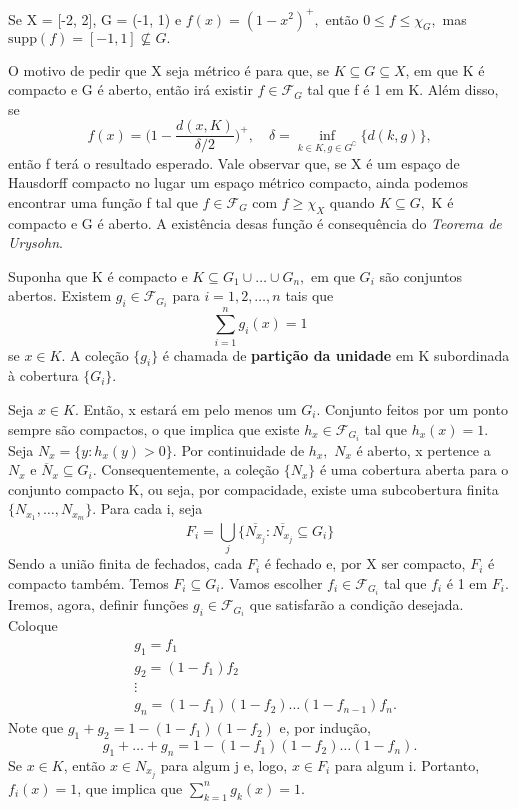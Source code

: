 \documentclass[measure_theory.tex]{subfiles}
\begin{document}
\begin{example}
	Se X = [-2, 2], G = (-1, 1) e \(f(x) = (1-x^{2})^{+},\) então \(0 \leq f \leq \chi_{G},\) mas \(\mathrm{supp}(f) = [-1, 1]\not\subseteq G.\)
\end{example}
O motivo de pedir que X seja métrico é para que, se \(K\subseteq G\subseteq X\), em que K é compacto e G é aberto, então irá existir \(f\in \mathcal{F}_{G}\) tal que f é 1 em K. Além disso, se
\[
	f(x) = \biggl(1 - \frac{d(x, K)}{\delta/2}\biggr)^{+},\quad \delta  = \inf_{k\in K, g\in G ^{\complement}}\{d(k, g)\},
\]
então f terá o resultado esperado. Vale observar que, se X é um espaço de Hausdorff compacto no lugar um espaço métrico compacto, ainda podemos encontrar uma função f tal que \(f\in \mathcal{F}_{G}\) com \(f\geq \chi_{X}\) quando \(K\subseteq G,\) K é compacto e G é aberto. A existência desas função
é consequência do \textit{Teorema de Urysohn}.
\begin{prop*}
	Suponha que K é compacto e \(K\subseteq G_1\cup \dotsc \cup G_{n},\) em que \(G_{i}\) são conjuntos abertos. Existem \(g_{i}\in \mathcal{F}_{G_{i}}\) para \(i= 1, 2, \dotsc , n\) tais que
	\[
		\sum\limits_{i=1}^{n}g_{i}(x) = 1
	\]
	se \(x\in K\). A coleção \(\{g_{i}\}\) é chamada de \textbf{partição da unidade} em K subordinada à cobertura \(\{G_{i}\}\).
\end{prop*}
\begin{proof*}
	Seja \(x\in K.\) Então, x estará em pelo menos um \(G_{i}\). Conjunto feitos por um ponto sempre são compactos, o que implica que existe \(h_{x}\in \mathcal{F}_{G_{i}}\) tal que \(h_{x}(x) = 1.\) Seja \(N_{x} = \{y: h_{x}(y) > 0\}.\) Por continuidade de \(h_{x},\) \(N_{x}\) é aberto, x pertence a \(N_{x}\) e \(\overline{N}_{x}\subseteq G_{i}.\)
	Consequentemente, a coleção \(\{N_{x}\}\) é uma cobertura aberta para o conjunto compacto K, ou seja, por compacidade, existe uma subcobertura finita \(\{N_{x_{1}},\dotsc ,N_{x_{m}}\}\). Para cada i, seja
	\[
		F_{i} = \bigcup_{j}^{}\{\overline{N_{x_{j}}}: \overline{N_{x_{j}}}\subseteq G_{i}\}
	\]
	Sendo a união finita de fechados, cada \(F_{i}\) é fechado e, por X ser compacto, \(F_{i}\) é compacto também. Temos \(F_{i}\subseteq G_{i}\). Vamos escolher \(f_{i}\in \mathcal{F}_{G_{i}}\) tal que \(f_{i}\) é 1 em \(F_{i}.\) Iremos, agora, definir funções \(g_{i}\in \mathcal{F}_{G_{i}}\) que satisfarão
	a condição desejada. Coloque
	\begin{align*}
		 & g_1 = f_1                                    \\
		 & g_2 = (1-f_1)f_2                             \\
		 & \vdots                                       \\
		 & g_n = (1-f_1)(1-f_2)\dotsc (1-f_{n-1})f_{n}.
	\end{align*}
	Note que \(g_1 + g_2 = 1 - (1-f_1)(1-f_2)\) e, por indução,
	\[
		g_1 + \dotsc + g_{n} =1 - (1-f_1)(1-f_2)\dotsc (1-f_{n}).
	\]
	Se \(x\in K\), então \(x\in N_{x_{j}}\) para algum j e, logo, \(x\in F_{i}\) para algum i. Portanto, \(f_{i}(x) = 1\), que implica que \(\sum\limits_{k=1}^{n}g_{k}(x) = 1\). \qedsymbol
\end{proof*}
\end{document}

